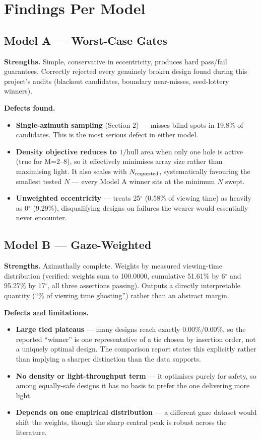 \section{Findings Per Model}

\subsection{Model A --- Worst-Case Gates}
\textbf{Strengths.} Simple, conservative in eccentricity, produces hard
pass/fail guarantees. Correctly rejected every genuinely broken design
found during this project's audits (blackout candidates, boundary
near-misses, seed-lottery winners).

\textbf{Defects found.}
\begin{itemize}
  \item \textbf{Single-azimuth sampling} (Section 2) --- misses blind
  spots in 19.8\% of candidates. This is the most serious defect in
  either model.
  \item \textbf{Density objective reduces to $1/\text{hull area}$} when
  only one hole is active (true for M=2--8), so it effectively minimises
  array size rather than maximising light. It also scales with
  $N_{\rm requested}$, systematically favouring the smallest tested $N$
  --- every Model A winner sits at the minimum $N$ swept.
  \item \textbf{Unweighted eccentricity} --- treats 25$^\circ$ (0.58\% of
  viewing time) as heavily as 0$^\circ$ (9.29\%), disqualifying designs
  on failures the wearer would essentially never encounter.
\end{itemize}

\subsection{Model B --- Gaze-Weighted}
\textbf{Strengths.} Azimuthally complete. Weights by measured viewing-time
distribution (verified: weights sum to 100.0000, cumulative 51.61\% by
6$^\circ$ and 95.27\% by 17$^\circ$, all three assertions passing).
Outputs a directly interpretable quantity (``\% of viewing time
ghosting'') rather than an abstract margin.

\textbf{Defects and limitations.}
\begin{itemize}
  \item \textbf{Large tied plateaus} --- many designs reach exactly
  0.00\%/0.00\%, so the reported ``winner'' is one representative of a
  tie chosen by insertion order, not a uniquely optimal design. The
  comparison report states this explicitly rather than implying a
  sharper distinction than the data supports.
  \item \textbf{No density or light-throughput term} --- it optimises
  purely for safety, so among equally-safe designs it has no basis to
  prefer the one delivering more light.
  \item \textbf{Depends on one empirical distribution} --- a different
  gaze dataset would shift the weights, though the sharp central peak is
  robust across the literature.
\end{itemize}

\newpage
